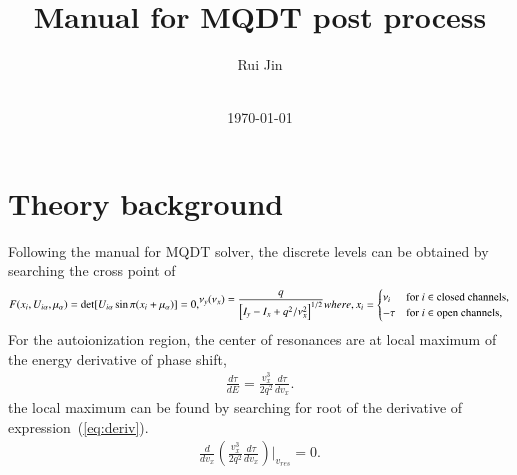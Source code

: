 \documentclass[11pt]{article}
\begin{document}
\title{Manual for MQDT post process}

\author{Rui Jin%
	\\
	\\
}

\normalem
\date{\today}
                     
\maketitle

\section{\label{sec:theory}Theory background}
Following the manual for MQDT solver,%
the discrete levels can be obtained by searching the cross point of 
\begin{subequations}
	\begin{align}
	\label{eq:mqdt}
	F({x_i},{U_{i\alpha},\mu_\alpha})=\det[U_{i\alpha}\sin\pi(x_i+\mu_\alpha)]=0,
	\end{align}
	\begin{align}\label{eq:energy}
	\nu_y(\nu_x) = \frac{q}{\left[I_y - I_x + q^2/\nu^{2}_x\right]^{1/2}}
	\end{align}
	where,
	\begin{align}
	x_i =
	\begin{cases}
	{\displaystyle \nu_i} & \mathrm{for}\ i\in \mathrm{closed\ channels,}\\
	{\displaystyle -\tau } &  \mathrm{for}\ i\in \mathrm{open\ channels,}
	\end{cases} \notag
	\end{align}
\end{subequations}
For the autoionization region, the center of resonances are at local maximum of the energy derivative of phase shift,
\begin{align}
   \label{eq:deriv}
   \frac{d\tau}{dE} = \frac{v_x^3}{2q^2}\frac{d\tau}{dv_x}. 
\end{align}
the local maximum can be found by searching for root of the derivative of expression~(\ref{eq:deriv}).
\begin{align}
\label{eq:sec-deriv}
\frac{d}{dv_x}\left(\frac{v_x^3}{2q^2}\frac{d\tau}{dv_x}\right) |_{v_{res}} = 0. 
\end{align}

\end{document}
